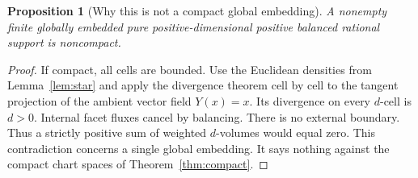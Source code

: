 \documentclass[11pt]{article}
\newtheorem{proposition}[theorem]{Proposition}
\theoremstyle{definition}\newtheorem{definition}[theorem]{Definition}
\theoremstyle{remark}\newtheorem{remark}[theorem]{Remark}
\begin{document}
\begin{proposition}[Why this is not a compact global embedding]\label{prop:noncompact}
A nonempty finite globally embedded pure positive-dimensional positive balanced rational support is noncompact.
\end{proposition}
\begin{proof}
If compact, all cells are bounded. Use the Euclidean densities from Lemma~\ref{lem:star} and apply the divergence theorem cell by cell to the tangent projection of the ambient vector field $Y(x)=x$. Its divergence on every $d$-cell is $d>0$. Internal facet fluxes cancel by balancing. There is no external boundary. Thus a strictly positive sum of weighted $d$-volumes would equal zero. This contradiction concerns a single global embedding. It says nothing against the compact chart spaces of Theorem~\ref{thm:compact}.
\end{proof}

\end{document}
